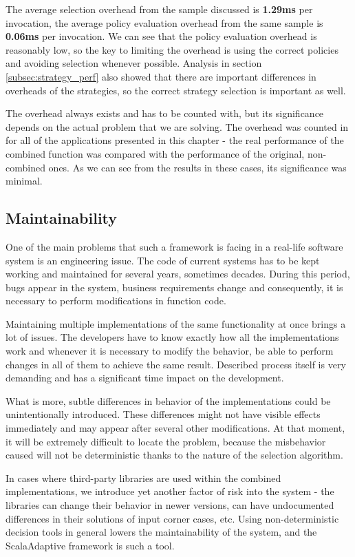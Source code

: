 The average selection overhead from the sample discussed is \textbf{1.29ms} per invocation, the average policy evaluation overhead from the same sample is \textbf{0.06ms} per invocation. We can see that the policy evaluation overhead is reasonably low, so the key to limiting the overhead is using the correct policies and avoiding selection whenever possible. Analysis in section \ref{subsec:strategy_perf} also showed that there are important differences in overheads of the strategies, so the correct strategy selection is important as well.

The overhead always exists and has to be counted with, but its significance depends on the actual problem that we are solving. The overhead was counted in for all of the applications presented in this chapter - the real performance of the combined function was compared with the performance of the original, non-combined ones. As we can see from the results in these cases, its significance was minimal.

\subsection{Maintainability}

One of the main problems that such a framework is facing in a real-life software system is an engineering issue. The code of current systems has to be kept working and maintained for several years, sometimes decades. During this period, bugs appear in the system, business requirements change and consequently, it is necessary to perform modifications in function code.

Maintaining multiple implementations of the same functionality at once brings a lot of issues. The developers have to know exactly how all the implementations work and whenever it is necessary to modify the behavior, be able to perform changes in all of them to achieve the same result. Described process itself is very demanding and has a significant time impact on the development. 

What is more, subtle differences in behavior of the implementations could be unintentionally introduced. These differences might not have visible effects immediately and may appear after several other modifications. At that moment, it will be extremely difficult to locate the problem, because the misbehavior caused will not be deterministic thanks to the nature of the selection algorithm.

In cases where third-party libraries are used within the combined implementations, we introduce yet another factor of risk into the system - the libraries can change their behavior in newer versions, can have undocumented differences in their solutions of input corner cases, etc. Using non-deterministic decision tools in general lowers the maintainability of the system, and the ScalaAdaptive framework is such a tool.

